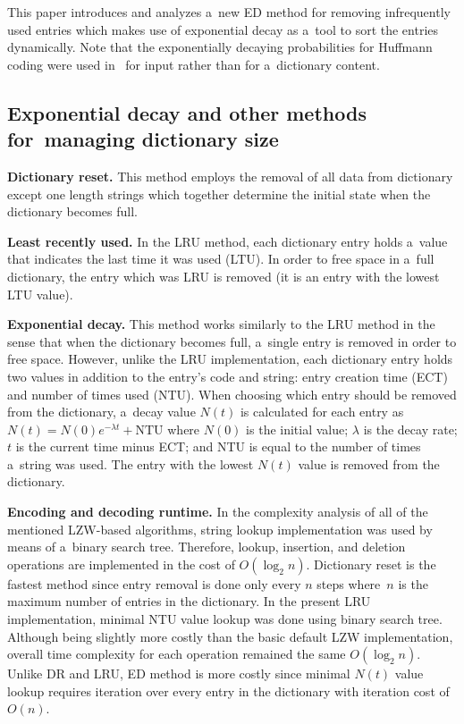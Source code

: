 \begin{multicols}{2}
This paper introduces and analyzes a~new {ED} method for removing infrequently 
used entries which makes use of exponential decay as a~tool to sort the
entries dynamically.
Note that the exponentially decaying probabilities for Huffmann coding were used 
in~\cite{T08} for input rather than for a~dictionary content.




\subsection{Exponential decay and other methods for~managing dictionary size}

\noindent 
\textbf{Dictionary reset.}
This method employs the removal of all data from dictionary except one 
length strings which together determine the initial state when the dictionary becomes 
full.

\noindent 
\textbf{Least recently used.}
In the {LRU} method, each dictionary entry holds a~value that indicates the last 
time it was used ({LTU}). In order to free space in a~full dictionary, the entry which 
was LRU is removed (it is an entry with the lowest {LTU} value).

\noindent
\textbf{Exponential decay.}
This method works similarly to the {LRU} method in the sense that when 
the dictionary becomes full, a~single entry is removed in order to free space. 
However, unlike the {LRU} implementation, each dictionary entry holds two values 
in addition to the entry's code and string: entry creation time ({ECT}) 
and number of times used 
({NTU}). When choosing which entry should be removed from the dictionary, 
a~decay value $N(t)$ is calculated for each entry as
$N(t)=N(0) e^{-\lambda t}+\mathrm{NTU}$ where
$N(0)$ is the initial value; $\lambda$ is the decay rate;
$t$ is the current time minus ECT; and 
NTU is equal to the number of times a~string was used.
The entry with the lowest $N(t)$ value is removed from the dictionary.

\noindent
 \textbf{Encoding and decoding runtime.}
In the complexity analysis of all of the mentioned {LZW}-based algorithms, 
string lookup implementation was used by means of a~binary search tree. Therefore, 
lookup, insertion, and deletion operations are implemented in the cost of $O(\log_2 n)$. 
{Dictionary reset} is the fastest method since entry removal is done only every $n$ steps 
where~$n$ is the maximum number of entries in the dictionary. 
In the present {LRU} implementation, minimal {NTU} value lookup was done 
using binary search tree. Although being slightly more costly than the basic 
default {LZW} implementation, overall time complexity for each operation 
remained the same $O(\log_2 n)$.
Unlike {DR} and {LRU}, {ED} method is more costly since minimal $N(t)$ 
value lookup requires iteration over every entry in the dictionary with iteration cost of 
$O(n)$.


\end{multicols}
